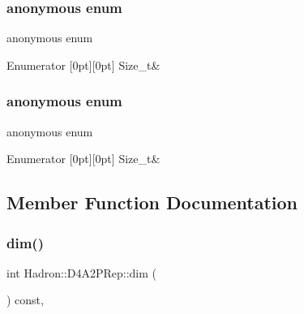 \subsubsection{\texorpdfstring{anonymous enum}{anonymous enum}}
{\footnotesize\ttfamily anonymous enum}

\begin{DoxyEnumFields}{Enumerator}
[0pt][0pt]{}\mbox{\label{structHadron_1_1D4A2PRep_a382344882a33cf50d56f264efa4873deaf640bb2b47620daafc46e1bc50bc2104}} 
Size\+\_\+t&\\
\hline

\end{DoxyEnumFields}
\mbox{\label{structHadron_1_1D4A2PRep_a382344882a33cf50d56f264efa4873de}} 
\subsubsection{\texorpdfstring{anonymous enum}{anonymous enum}}
{\footnotesize\ttfamily anonymous enum}

\begin{DoxyEnumFields}{Enumerator}
[0pt][0pt]{}\mbox{\label{structHadron_1_1D4A2PRep_a382344882a33cf50d56f264efa4873deaf640bb2b47620daafc46e1bc50bc2104}} 
Size\+\_\+t&\\
\hline

\end{DoxyEnumFields}


\subsection{Member Function Documentation}
\mbox{\label{structHadron_1_1D4A2PRep_ace9d2d2d6b73e3ec4de7682a8930ff1c}} 
\subsubsection{\texorpdfstring{dim()}{dim()}\hspace{0.1cm}{\footnotesize\ttfamily [1/2]}}
{\footnotesize\ttfamily int Hadron\+::\+D4\+A2\+P\+Rep\+::dim (\begin{DoxyParamCaption}{ }\end{DoxyParamCaption}) const\hspace{0.3cm}{\ttfamily [inline]}, {\ttfamily [virtual]}}

